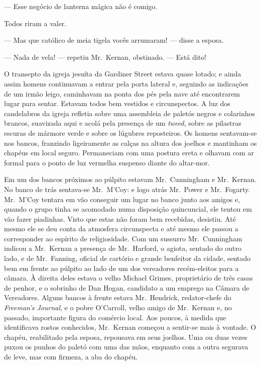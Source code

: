 --- Esse negócio de lanterna mágica não é comigo.  

Todos riram a valer.

--- Mas que católico de meia tigela vocês arrumaram! --- disse a esposa.

--- Nada de vela! --- repetiu Mr.~Kernan, obstinado.  --- Está dito!

\smallskip

\noindent\dotfill

\smallskip

O transepto da igreja jesuíta da Gardiner Street estava quase lotado; e ainda
assim homens continuavam a entrar pela porta lateral e, seguindo as indicações
de um irmão leigo, caminhavam na ponta dos pés pela nave até encontrarem lugar
para sentar.  Estavam todos bem vestidos e circunspectos.  A luz dos
candelabros da igreja refletia sobre uma assembleia de paletós negros e
colarinhos brancos, suavizada aqui e acolá pela presença de um \textit{tweed},
sobre as pilastras escuras de mármore verde e sobre os lúgubres reposteiros.
Os homens sentavam-se nos bancos, franzindo ligeiramente as calças na altura
dos joelhos e mantinham os chapéus em local seguro.  Permaneciam com uma
postura ereta e olhavam com ar formal para o ponto de luz vermelha suspenso
diante do altar-mor.

Em um dos bancos próximos ao púlpito estavam Mr.~Cunningham e Mr.~Kernan.  No
banco de trás sentava-se Mr.~M’Coy: e logo atrás Mr.~Power e Mr.~Fogarty.  
Mr.~M’Coy tentara em vão conseguir um lugar no banco junto aos amigos e, quando o
grupo tinha se acomodado numa disposição quincuncial, ele tentou em vão fazer
piadinhas.  Visto que estas não foram bem recebidas, desistiu.  Até mesmo ele
se deu conta da atmosfera circunspecta e até mesmo ele passou a corresponder ao
espírito de religiosidade.  Com um sussurro Mr.~Cunningham indicou a Mr.~Kernan
a presença de Mr.~Harford, o agiota, sentado do outro lado, e de Mr.~Fanning,
oficial de cartório e grande benfeitor da cidade, sentado bem em frente ao
púlpito ao lado de um dos vereadores recém-eleitos para a câmara.  À direita
deles estava o velho Michael Grimes, proprietário de três casas de penhor, e o
sobrinho de Dan Hogan, candidato a um emprego na Câmara de Vereadores.  Alguns
bancos à frente estava Mr.~Hendrick, redator-chefe do \textit{Freeman’s
Journal}, e o pobre O’Carroll, velho amigo de Mr.~Kernan e, no passado,
importante figura do comércio local.  Aos poucos, à medida que identificava
rostos conhecidos, Mr.~Kernan começou a sentir-se mais à vontade.  O chapéu,
reabilitado pela esposa, repousava em seus joelhos.  Uma ou duas vezes puxou os
punhos do paletó com uma das mãos, enquanto com a outra segurava de leve, mas
com firmeza, a aba do chapéu.

